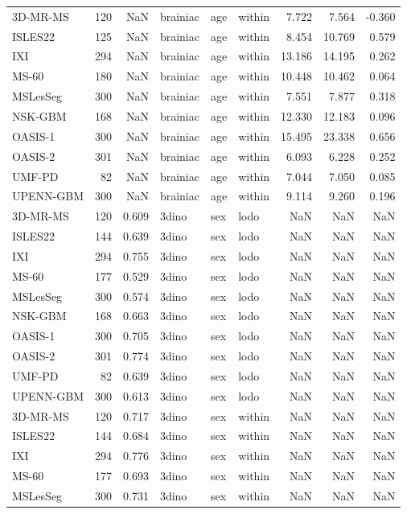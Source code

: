 \begin{tabular}{lrrlllrrr}
3D-MR-MS & 120 & NaN & brainiac & age & within & 7.722 & 7.564 & -0.360 \\
ISLES22 & 125 & NaN & brainiac & age & within & 8.454 & 10.769 & 0.579 \\
IXI & 294 & NaN & brainiac & age & within & 13.186 & 14.195 & 0.262 \\
MS-60 & 180 & NaN & brainiac & age & within & 10.448 & 10.462 & 0.064 \\
MSLesSeg & 300 & NaN & brainiac & age & within & 7.551 & 7.877 & 0.318 \\
NSK-GBM & 168 & NaN & brainiac & age & within & 12.330 & 12.183 & 0.096 \\
OASIS-1 & 300 & NaN & brainiac & age & within & 15.495 & 23.338 & 0.656 \\
OASIS-2 & 301 & NaN & brainiac & age & within & 6.093 & 6.228 & 0.252 \\
UMF-PD & 82 & NaN & brainiac & age & within & 7.044 & 7.050 & 0.085 \\
UPENN-GBM & 300 & NaN & brainiac & age & within & 9.114 & 9.260 & 0.196 \\
3D-MR-MS & 120 & 0.609 & 3dino & sex & lodo & NaN & NaN & NaN \\
ISLES22 & 144 & 0.639 & 3dino & sex & lodo & NaN & NaN & NaN \\
IXI & 294 & 0.755 & 3dino & sex & lodo & NaN & NaN & NaN \\
MS-60 & 177 & 0.529 & 3dino & sex & lodo & NaN & NaN & NaN \\
MSLesSeg & 300 & 0.574 & 3dino & sex & lodo & NaN & NaN & NaN \\
NSK-GBM & 168 & 0.663 & 3dino & sex & lodo & NaN & NaN & NaN \\
OASIS-1 & 300 & 0.705 & 3dino & sex & lodo & NaN & NaN & NaN \\
OASIS-2 & 301 & 0.774 & 3dino & sex & lodo & NaN & NaN & NaN \\
UMF-PD & 82 & 0.639 & 3dino & sex & lodo & NaN & NaN & NaN \\
UPENN-GBM & 300 & 0.613 & 3dino & sex & lodo & NaN & NaN & NaN \\
3D-MR-MS & 120 & 0.717 & 3dino & sex & within & NaN & NaN & NaN \\
ISLES22 & 144 & 0.684 & 3dino & sex & within & NaN & NaN & NaN \\
IXI & 294 & 0.776 & 3dino & sex & within & NaN & NaN & NaN \\
MS-60 & 177 & 0.693 & 3dino & sex & within & NaN & NaN & NaN \\
MSLesSeg & 300 & 0.731 & 3dino & sex & within & NaN & NaN & NaN \\

\end{tabular}
